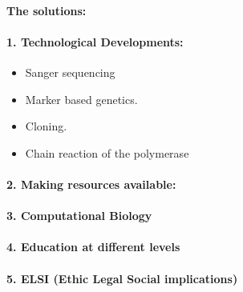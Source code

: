 \paragraph{The solutions: }

\paragraph*{1. Technological Developments:}
\begin{itemize}
    \item Sanger sequencing
    \item Marker based genetics.
    \item Cloning.
    \item Chain reaction of the polymerase
\end{itemize}
\paragraph*{2. Making resources available:  }
\paragraph*{3. Computational Biology}
\paragraph*{4. Education at different levels}
\paragraph*{5. ELSI (Ethic Legal Social implications)}




